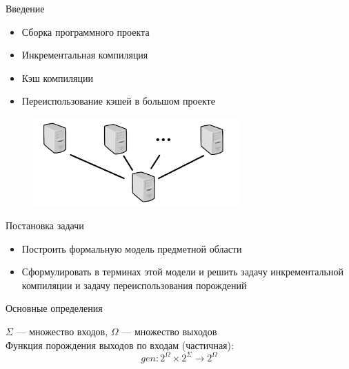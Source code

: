 

% 




{
	\begin{frame}
		\titlepage
	\end{frame}
}
\addtocounter{framenumber}{-1}

\begin{frame}{Введение}
\begin{itemize}
	\item Сборка программного проекта
	\item Инкрементальная компиляция
	\item Кэш компиляции
	\item Переиспользование кэшей в большом проекте
\end{itemize}
\begin{figure}[!h]
	\begin{center}
		\includegraphics[width=80mm]{network.png}
	\end{center}
\end{figure}
\end{frame}

\begin{frame}{Постановка задачи}
\begin{itemize}
	\item Построить формальную модель предметной области
	\item Сформулировать в терминах этой модели и решить задачу инкрементальной компиляции и задачу переиспользования порождений
\end{itemize}
\end{frame}

\begin{frame}{Основные определения}

$\Sigma$ --- множество входов, $\Omega$ --- множество выходов\\
Функция порождения выходов по входам (частичная):
$$gen : 2^\Omega \times 2^\Sigma \to 2^\Omega$$

\end{frame}

